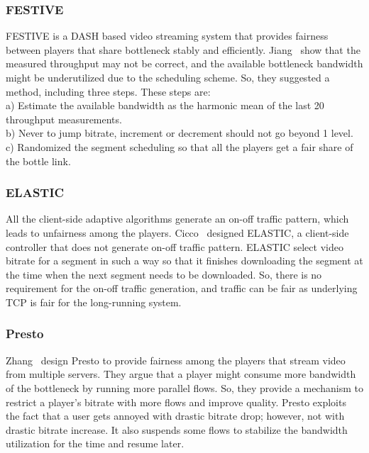 \subsubsection{FESTIVE}
FESTIVE\cite{10.1145/2413176.2413189} is a DASH based video streaming system that provides fairness between players that share bottleneck stably and efficiently. Jiang \etal\ show that the measured throughput may not be correct, and the available bottleneck bandwidth might be underutilized due to the scheduling scheme. So, they suggested a method, including three steps. These steps are:\\
a) Estimate the available bandwidth as the harmonic mean of the last 20 throughput measurements.\\
b) Never to jump bitrate, increment or decrement should not go beyond 1 level. \\
c) Randomized the segment scheduling so that all the players get a fair share of the bottle link.

\subsubsection{ELASTIC}
All the client-side adaptive algorithms generate an on-off traffic pattern, which leads to unfairness among the players. Cicco \etal\ designed ELASTIC\cite{6691442}, a client-side controller that does not generate on-off traffic pattern. ELASTIC select video bitrate for a segment in such a way so that it finishes downloading the segment at the time when the next segment needs to be downloaded. So, there is no requirement for the on-off traffic generation, and traffic can be fair as underlying TCP is fair for the long-running system.

\subsubsection{Presto}
Zhang \etal\ design Presto\cite{7249417} to provide fairness among the players that stream video from multiple servers. They argue that a player might consume more bandwidth of the bottleneck by running more parallel flows. So, they provide a mechanism to restrict a player's bitrate with more flows and improve quality. Presto exploits the fact that a user gets annoyed with drastic bitrate drop; however, not with drastic bitrate increase\cite{10.1145/2018602.2018611}. It also suspends some flows to stabilize the bandwidth utilization for the time and resume later.


